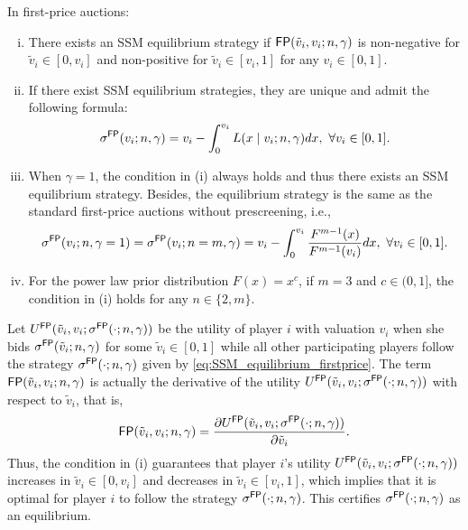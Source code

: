 \begin{theorem}
\label{thm:SSM_firstprice}
In first-price auctions:
\begin{enumerate}[(i)]
    \item There exists an SSM equilibrium strategy if $\mathsf{FP}(\tilde{v}_i,v_i;n,\gamma)$ is non-negative for $\tilde{v}_i\in [0,v_i]$ and non-positive for $\tilde{v}_i\in [v_i,1]$ for any $v_i\in [0,1]$.
    \item If there exist SSM equilibrium strategies, they are unique and admit the following formula:
    \begin{align}
    \label{eq:SSM_equilibrium_firstprice}
     \sigma^{\mathsf{FP}}(v_i;n,\gamma) = v_i - \int_0^{v_i}L(x\mid v_i;n,\gamma)dx,~ \forall v_i \in [0,1] .  
    \end{align}
    \item When $\gamma=1$, the condition in (i) always holds and thus there exists an SSM equilibrium strategy. Besides, the equilibrium strategy is the same as the standard first-price auctions without prescreening, i.e.,
    \begin{align*}
     \sigma^{\mathsf{FP}}(v_i;n,\gamma=1) = \sigma^{\mathsf{FP}}(v_i;n=m,\gamma) = v_i - \int_0^{v_i} \frac{F^{m-1}(x)}{F^{m-1}(v_i)}  dx,~\forall v_i\in [0,1].
    \end{align*}
    \item For the power law prior distribution $F(x)=x^c$, if $m=3$ and $c\in (0,1]$, the condition in (i) holds for any $n\in \{2,m\}$. 
\end{enumerate}
\end{theorem}

Let $U^{\mathsf{FP}}(\tilde{v}_i,v_i;\sigma^{\mathsf{FP}}(\cdot;n,\gamma))$ be the utility of player $i$ with valuation $v_i$ when she bids $\sigma^{\mathsf{FP}}(\tilde{v}_i;n,\gamma)$ for some $\tilde{v}_i\in [0,1]$ while all other participating players follow the strategy $\sigma^{\mathsf{FP}}(\cdot;n,\gamma)$ given by \eqref{eq:SSM_equilibrium_firstprice}. The term $\mathsf{FP}(\tilde{v}_i,v_i;n,\gamma)$ is actually the derivative of the utility $U^{\mathsf{FP}}(\tilde{v}_i,v_i;\sigma^{\mathsf{FP}}(\cdot;n,\gamma))$ with respect to $\tilde{v}_i$, that is,
\begin{align*}
  \mathsf{FP}(\tilde{v}_i,v_i;n,\gamma) =\frac{\partial U^{\mathsf{FP}}(\tilde{v}_i,v_i;\sigma^{\mathsf{FP}}(\cdot;n,\gamma))}{\partial \tilde{v}_i}.
\end{align*}
Thus, the condition in  (i) guarantees that player $i$'s utility $U^{\mathsf{FP}}(\tilde{v}_i,v_i;\sigma^{\mathsf{FP}}(\cdot;n,\gamma))$ increases in $\tilde{v}_i\in [0,v_i]$ and decreases in $\tilde{v}_i\in [v_i,1]$, which implies that it is optimal for player $i$ to follow the strategy $\sigma^{\mathsf{FP}}(\cdot;n,\gamma)$. This certifies $\sigma^{\mathsf{FP}}(\cdot;n,\gamma)$ as an equilibrium.

